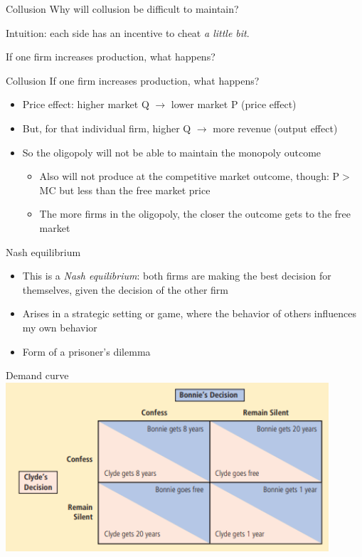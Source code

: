 \documentclass[aspectratio=169]{beamer}
\begin{document}
\begin{frame}{Collusion}
    Why will collusion be difficult to maintain? 

    \vspace{2mm}

    Intuition: each side has an incentive to cheat \textit{a little bit}.

    \vspace{2mm}

    If one firm increases production, what happens?
\end{frame}

\begin{frame}{Collusion}
    If one firm increases production, what happens?
    \begin{itemize}
        \item Price effect: higher market Q $\rightarrow$ lower market P (price effect)
        \item But, for that individual firm, higher Q $\rightarrow$ more revenue (output effect)
        \item So the oligopoly will not be able to maintain the monopoly outcome
        \begin{itemize}
            \item Also will not produce at the competitive market outcome, though: P$>$ MC but less than the free market price
            \item The more firms in the oligopoly, the closer the outcome gets to the free market
        \end{itemize}
    \end{itemize}
\end{frame}

\begin{frame}{Nash equilibrium}
    \begin{itemize}
        \item This is a \textit{Nash equilibrium}: both firms are making the best decision for themselves, given the decision of the other firm
        \item Arises in a strategic setting or game, where the behavior of others influences my own behavior
        \item Form of a prisoner's dilemma
    \end{itemize}
\end{frame}

\begin{frame}{Demand curve}
    \centering
    \includegraphics[width = 0.9\textwidth,keepaspectratio]{prisoners.png}
\end{frame}
\end{document}
